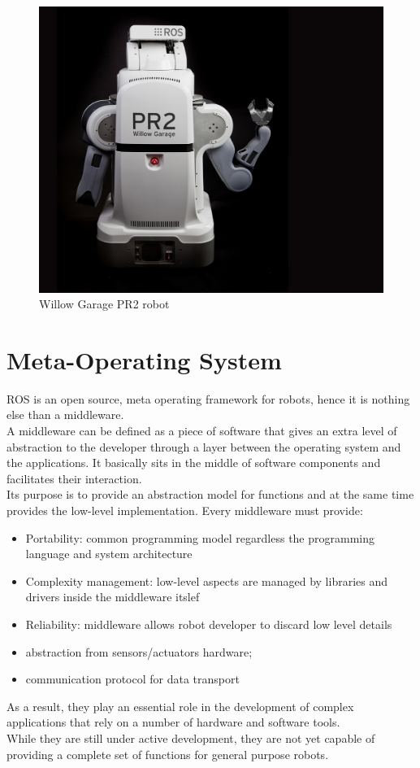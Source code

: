 \begin{figure}[H]
    \centering
    \includegraphics[scale=0.16]{Images/Chapter 1/PR2_Robot_Willow_Garage_6-1.jpeg}
    \caption{Willow Garage PR2 robot}
    \label{fig:PR2}
\end{figure}
\newpage
\section{Meta-Operating System}
ROS is an open source, meta operating framework for robots, hence it is nothing else than a middleware. \\
A middleware can be defined as a piece of software that gives an extra level of abstraction to the developer through a layer between the operating system and the applications.
It basically sits in the middle of software components and facilitates their interaction. \\
Its purpose is to provide an abstraction model for functions and at the same time provides the low-level implementation.
Every middleware must provide:
\begin{itemize}
    \item Portability: common programming model regardless the programming language and system architecture
    \item Complexity management: low-level aspects are managed by libraries and drivers inside the middleware itslef
    \item Reliability: middleware allows robot developer to discard low level details
    \item abstraction from sensors/actuators hardware;
    \item communication protocol for data transport
\end{itemize}
 As a result, they play an essential role in the development of complex applications that rely on a number of hardware and software tools.\\
 While they are still under active development, they are not yet capable of providing a complete set of functions for general purpose robots.
 
